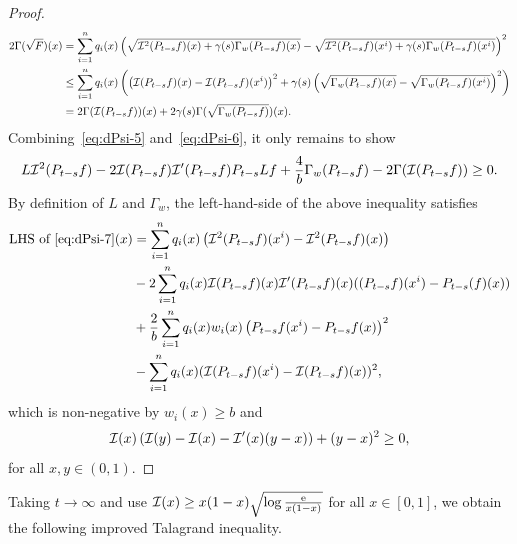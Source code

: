 \begin{proof}
\begin{align*}
        2\Gamma(\sqrt{F})(x) &= \sum_{i=1}^n q_i(x) \left(\sqrt{\mathcal{I}^2(P_{t-s} f)(x) + \gamma(s) \Gamma_w(P_{t-s} f)(x)} - \sqrt{\mathcal{I}^2(P_{t-s} f)(x^i) + \gamma(s) \Gamma_w(P_{t-s} f)(x^i)}\right)^2\\
        &\le \sum_{i=1}^n q_i(x) \left(\left(\mathcal{I}(P_{t-s} f)(x) - \mathcal{I}(P_{t-s} f)(x^i)\right)^2 + \gamma(s) \left(\sqrt{\Gamma_w(P_{t-s} f)(x)} - \sqrt{\Gamma_w(P_{t-s} f)(x^i)}\right)^2\right)\\
        &=2\Gamma(\mathcal{I}(P_{t-s}f))(x) + 2\gamma(s) \Gamma(\sqrt{\Gamma_w(P_{t-s} f)})(x).
    \end{align*}
    Combining~\eqref{eq:dPsi-5} and~\eqref{eq:dPsi-6}, it only remains to show
    \begin{align}\label{eq:dPsi-7}
        L \mathcal{I}^2(P_{t-s} f) - 2 \mathcal{I}(P_{t-s} f) \mathcal{I}'(P_{t-s} f) P_{t-s} L f+ \frac{4}{b}\Gamma_w(P_{t-s} f) - 2 \Gamma(\mathcal{I}(P_{t-s} f)) \ge 0.
    \end{align}
    By definition of $L$ and $\Gamma_w$, the left-hand-side of the above inequality satisfies
    \begin{align*}
    \text{LHS of~\eqref{eq:dPsi-7}}(x) &= \sum_{i=1}^n q_i(x) \left(\mathcal{I}^2(P_{t-s} f)(x^i) - \mathcal{I}^2(P_{t-s} f)(x)\right)\\
    &- 2 \sum_{i=1}^n q_i(x) \mathcal{I}(P_{t-s} f)(x) \mathcal{I}'(P_{t-s} f)(x) ((P_{t-s} f)(x^i) - P_{t-s}(f)(x))\\
    &+ \frac{2}{b}\sum_{i=1}^n q_i(x) w_i(x) \left(P_{t-s} f(x^i) - P_{t-s} f(x)\right)^2\\
    &-\sum_{i=1}^n q_i(x) (\mathcal{I}(P_{t-s} f)(x^i) - \mathcal{I}(P_{t-s} f)(x))^2,
    \end{align*}
    which is non-negative by $w_i(x) \ge b$ and
    \begin{align*}
        \mathcal{I}(x)\left(\mathcal{I}(y) - \mathcal{I}(x) - \mathcal{I}'(x)(y-x)\right) + (y-x)^2 \ge 0,
    \end{align*}
    for all $x,y \in (0,1)$.
\end{proof}

Taking $t \to \infty$ and use $\mathcal{I}(x) \ge x(1-x) \sqrt{\log \frac{\mathrm{e}}{x(1-x)}}$ for all $x \in [0,1]$, we obtain the following improved Talagrand inequality.

